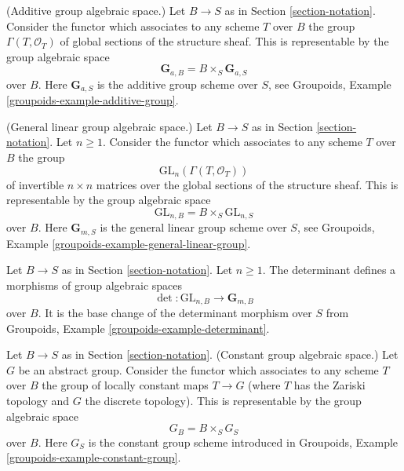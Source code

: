 \begin{example}
\label{example-additive-group}
(Additive group algebraic space.)
Let $B \to S$ as in Section \ref{section-notation}.
Consider the functor which associates
to any scheme $T$ over $B$ the group $\Gamma(T, \mathcal{O}_T)$
of global sections of the structure sheaf.
This is representable by the group algebraic space
$$
\mathbf{G}_{a, B} = B \times_S \mathbf{G}_{a, S}
$$
over $B$. Here $\mathbf{G}_{a, S}$ is the additive group scheme
over $S$, see
Groupoids, Example \ref{groupoids-example-additive-group}.
\end{example}

\begin{example}
\label{example-general-linear-group}
(General linear group algebraic space.)
Let $B \to S$ as in Section \ref{section-notation}.
Let $n \geq 1$.
Consider the functor which associates
to any scheme $T$ over $B$ the group
$$
\text{GL}_n(\Gamma(T, \mathcal{O}_T))
$$
of invertible $n \times n$ matrices over
the global sections of the structure sheaf.
This is representable by the group algebraic space
$$
\text{GL}_{n, B} = B \times_S \text{GL}_{n, S}
$$
over $B$. Here $\mathbf{G}_{m, S}$ is the general linear group scheme
over $S$, see
Groupoids, Example \ref{groupoids-example-general-linear-group}.
\end{example}

\begin{example}
\label{example-determinant}
Let $B \to S$ as in Section \ref{section-notation}.
Let $n \geq 1$.
The determinant defines a morphisms of group algebraic spaces
$$
\det : \text{GL}_{n, B} \longrightarrow \mathbf{G}_{m, B}
$$
over $B$. It is the base change of the determinant morphism
over $S$ from
Groupoids, Example \ref{groupoids-example-determinant}.
\end{example}

\begin{example}
\label{example-constant-group}
Let $B \to S$ as in Section \ref{section-notation}.
(Constant group algebraic space.)
Let $G$ be an abstract group. Consider the functor
which associates to any scheme $T$ over $B$ the group
of locally constant maps $T \to G$ (where $T$ has the Zariski topology
and $G$ the discrete topology). This is representable by the
group algebraic space
$$
G_B = B \times_S G_S
$$
over $B$. Here $G_S$ is the constant group scheme introduced in
Groupoids, Example \ref{groupoids-example-constant-group}.
\end{example}





